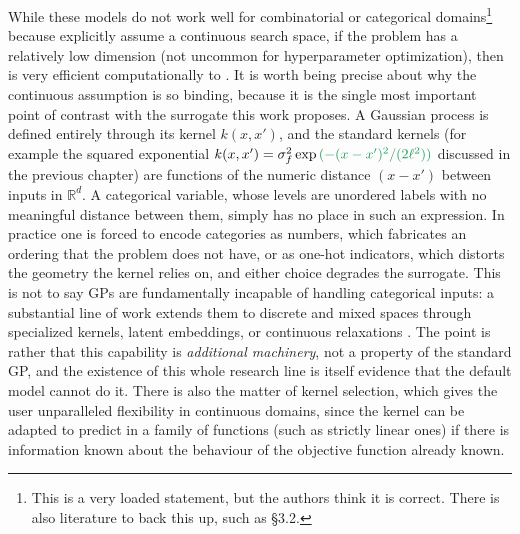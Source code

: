 While these models do not work well for combinatorial or categorical domains\footnote{This is a very loaded statement, but the authors think it is correct. There is also literature to back this up, such as \cite{wang2023recent} \S 3.2.} because  explicitly assume a continuous search space, if the problem has a relatively low dimension (not uncommon for hyperparameter optimization), then  is very efficient computationally to . It is worth being precise about why the continuous assumption is so binding, because it is the single most important point of contrast with the surrogate this work proposes. A Gaussian process is defined entirely through its kernel $k(x,x')$, and the standard kernels (for example the squared exponential $k(x,x') = \sigma_f^2 \exp\green{(-(x-x')^2 / (2\ell^2))}$ discussed in the previous chapter) are functions of the numeric distance $(x - x')$ between inputs in $\mathbb{R}^d$. A categorical variable, whose levels are unordered labels with no meaningful distance between them, simply has no place in such an expression. In practice one is forced to encode categories as numbers, which fabricates an ordering that the problem does not have, or as one-hot indicators, which distorts the geometry the kernel relies on, and either choice degrades the surrogate. This is not to say GPs are fundamentally incapable of handling categorical inputs: a substantial line of work extends them to discrete and mixed spaces through specialized kernels, latent embeddings, or continuous relaxations \cite{garrido2020dealing, ru2020cocabo, zhang2020latent, wan2021casmopolitan}. The point is rather that this capability is \emph{additional machinery}, not a property of the standard GP, and the existence of this whole research line is itself evidence that the default model cannot do it. There is also the matter of kernel selection, which gives the user unparalleled flexibility in continuous domains, since the kernel can be adapted to predict in a family of functions (such as strictly linear ones) if there is information known about the behaviour of the objective function already known.

